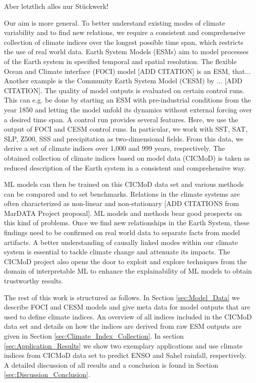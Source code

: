 \documentclass{CUP-JNL-DTM}%
\theoremstyle{definition}
\numberwithin{equation}{section}
\begin{document}
Aber letztlich alles nur Stückwerk! 

Our aim is more general. To better understand existing modes of climate variability and to find new relations, we require a consistent and comprehensive collection of climate indices over the longest possible time span, which restricts the use of real world data. Earth System Models (ESMs) aim to model processes of the Earth system in specified temporal and spatial resolution. The flexible Ocean and Climate interface (FOCI) model [ADD CITATION] is an ESM, that... Another example is the Community Earth System Model (CESM) by ... [ADD CITATION]. The quality of model outputs is evaluated on certain control runs. This can e.g. be done by starting an ESM with pre-industrial conditions from the year 1850 and letting the model unfold its dynamics without external forcing over a desired time span. A control run provides several features. Here, we use the output of FOCI and CESM control runs. In particular, we work with SST, SAT, SLP, Z500, SSS and precipitation as two-dimensional fields. From this data, we derive a set of climate indices over 1,000 and 999 years, respectively. The obtained collection of climate indices based on model data (CICMoD) is taken as reduced description of the Earth system in a consistent and comprehensive way. 

ML models can then be trained on this CICMoD data set and various methods can be compared and to set benchmarks. Relations in the climate systems are often characterized as non-linear and non-stationary [ADD CITATIONS from MarDATA Project proposal]. ML models and methods bear good prospects on this kind of problems. Once we find new relationships in the Earth System, these findings need to be confirmed on real world data to separate facts from model artifacts. A better understanding of causally linked modes within our climate system is essential to tackle climate change and attenuate its impacts. 
The CICMoD project also opens the door to exploit and explore techniques from the domain of interpretable ML to enhance the explainability of ML models to obtain trustworthy results.

The rest of this work is structured as follows. In Section \ref{sec:Model_Data} we describe FOCI and CESM models and give meta data for model outputs that are used to define climate indices. An overview of all indices included in the CICMoD data set and details on how the indices are derived from raw ESM outputs are given in Section \ref{sec:Climate_Index_Collection}. In section \ref{sec:Application_Results} we show two exemplary applications and use climate indices from CICMoD data set to predict ENSO and Sahel rainfall, respectively. A detailed discussion of all results and a conclusion is found in Section \ref{sec:Discussion_Conclusion}.
\end{document}
